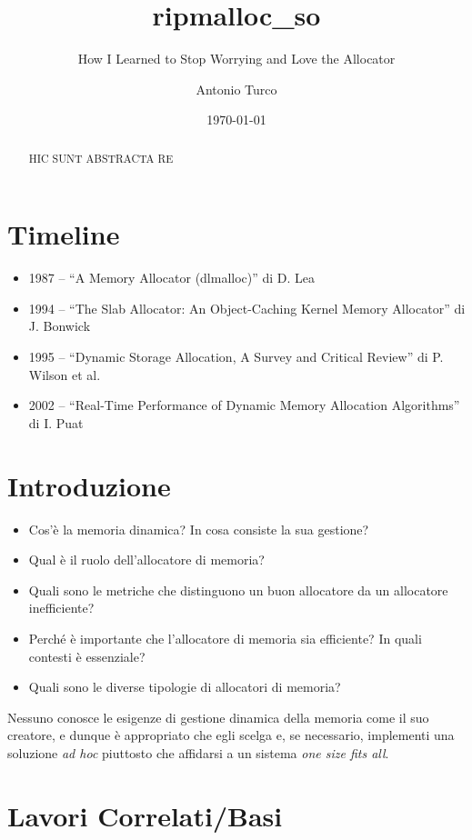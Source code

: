 \documentclass[noexaminfo]{sapthesis}
\title{ripmalloc\_so}
\subtitle{How I Learned to Stop Worrying and Love the Allocator}
\author{Antonio Turco}
\date{\today}
\begin{document}
\frontmatter  
\maketitle
\dedication{Dedicato a...}

\begin{abstract}
HIC SUNT ABSTRACTA RE
\end{abstract}

\tableofcontents

\mainmatter 
\chapter*{Timeline}
\begin{itemize}
  \item 1987 – ``A Memory Allocator (dlmalloc)'' di D. Lea
  \item 1994 – ``The Slab Allocator: An Object-Caching Kernel Memory Allocator'' di J. Bonwick
  \item 1995 – ``Dynamic Storage Allocation, A Survey and Critical Review'' di P. Wilson et al.
  \item 2002 – ``Real-Time Performance of Dynamic Memory Allocation Algorithms'' di I. Puat
\end{itemize}

\chapter{Introduzione}
\begin{itemize}
  \item Cos’è la memoria dinamica? In cosa consiste la sua gestione?
  \item Qual è il ruolo dell’allocatore di memoria?
  \item Quali sono le metriche che distinguono un buon allocatore da un allocatore inefficiente?
  \item Perché è importante che l’allocatore di memoria sia efficiente? In quali contesti è essenziale?
  \item Quali sono le diverse tipologie di allocatori di memoria?
\end{itemize}

Nessuno conosce le esigenze di gestione dinamica della memoria come il suo creatore, e dunque è appropriato che egli scelga e, se necessario, implementi una soluzione \textit{ad hoc} piuttosto che affidarsi a un sistema \textit{one size fits all}.

\chapter{Lavori Correlati/Basi}
\end{document}
